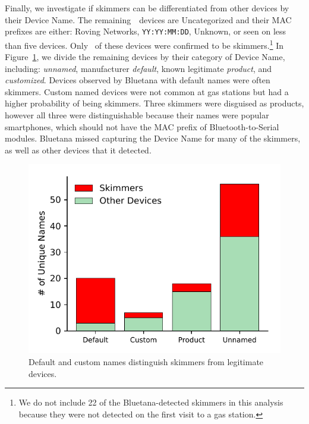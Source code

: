 Finally, we investigate if skimmers can be differentiated from other devices by
their Device Name.
%
The remaining~\numberBTMACCoDfiltered~devices are Uncategorized and their MAC prefixes are either: Roving Networks, \texttt{YY:YY:MM:DD}, Unknown, or seen on less than five devices.
%
Only
\totalskimmersfirstvisit~of these devices were confirmed to be
skimmers.\footnote{We do not include 22 of the Bluetana-detected skimmers in
this analysis because they were not detected on the first visit to a gas
station.}
%
In Figure~\ref{fig:hist_device_name}, we divide the remaining devices by their
category of Device Name, including: \emph{unnamed}, manufacturer
\emph{default}, known legitimate \emph{product}, and \emph{customized}.
%
Devices observed by Bluetana with default names were often skimmers.
%
Custom named devices were not common at gas stations but had a higher
probability of being skimmers.
%
Three skimmers were disguised as products, however all three were
distinguishable because their names were popular smartphones, which should not
have the MAC prefix of Bluetooth-to-Serial modules.
%
Bluetana missed capturing the Device Name for many of the skimmers, as well as other
devices that it detected.
%
 
%


\begin{figure}
    \centering
    \includegraphics[width=0.6\linewidth]{skimmer/plots/uncat_visit_hist_device_name.pdf}
    \caption{
    \label{fig:hist_device_name}
    Default and custom names distinguish skimmers from legitimate devices.
    }
\end{figure}


%

%

